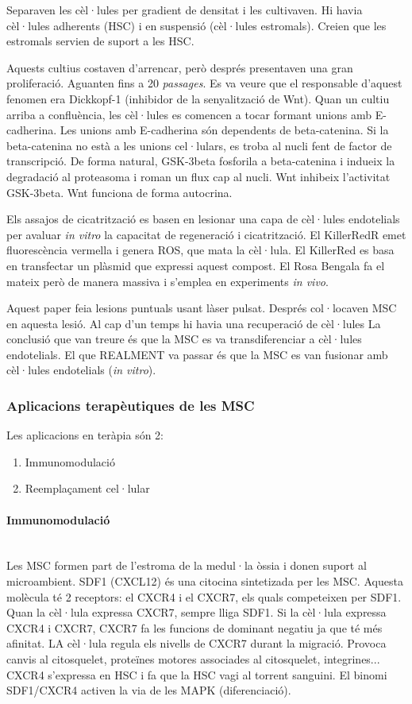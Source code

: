 Separaven les cèl·lules per gradient de densitat i les cultivaven. Hi
havia cèl·lules adherents (HSC) i en suspensió (cèl·lules
estromals). Creien que les estromals servien de suport a les HSC.

Aquests cultius costaven d'arrencar, però després presentaven una gran
proliferació. Aguanten fins a 20 \textit{passages}. Es va veure que el
responsable d'aquest fenomen era Dickkopf-1 (inhibidor de la
senyalització de Wnt). Quan un cultiu arriba a confluència, les
cèl·lules es comencen a tocar formant unions amb E-cadherina. Les
unions amb E-cadherina són dependents de beta-catenina. Si la
beta-catenina no està a les unions cel·lulars, es troba al nucli fent
de factor de transcripció. De forma natural, GSK-3beta fosforila a
beta-catenina i indueix la degradació al proteasoma i roman un flux
cap al nucli. Wnt inhibeix l'activitat GSK-3beta. Wnt funciona de
forma autocrina.


Els assajos de cicatrització es basen en lesionar una capa de
cèl·lules endotelials per avaluar \textit{in vitro} la capacitat de
regeneració i cicatrització. El KillerRedR emet fluorescència
vermella i genera ROS, que mata la cèl·lula. El KillerRed es basa en
transfectar un plàsmid que expressi aquest compost. El Rosa Bengala fa
el mateix però de manera massiva i s'emplea en experiments \textit{in
  vivo}.

Aquest paper feia lesions puntuals usant làser pulsat. Després
col·locaven MSC en aquesta lesió. Al cap d'un temps hi havia una
recuperació de cèl·lules La conclusió que van treure és que la MSC es
va transdiferenciar a cèl·lules endotelials. El que REALMENT va passar
és que la MSC es van fusionar amb cèl·lules endotelials (\textit{in vitro}).

\subsubsection{Aplicacions terapèutiques de les MSC}
Les aplicacions en teràpia són 2:
\begin{enumerate}
\item Immunomodulació


\item Reemplaçament cel·lular
\end{enumerate}

\paragraph{Immunomodulació} \hfill \\
Les MSC formen part de l'estroma de la medul·la òssia i donen suport
al microambient. SDF1 (CXCL12) és una citocina sintetizada per les
MSC. Aquesta molècula té 2 receptors: el CXCR4 i el CXCR7, els quals
competeixen per SDF1. Quan la cèl·lula expressa CXCR7, sempre lliga
SDF1. Si la cèl·lula expressa CXCR4 i CXCR7, CXCR7 fa les funcions de
dominant negatiu ja que té més afinitat. LA cèl·lula regula els
nivells de CXCR7 durant la migració. Provoca canvis al citosquelet,
proteïnes motores associades al citosquelet, integrines... CXCR4
s'expressa en HSC i fa que la HSC vagi al torrent sanguini. El binomi
SDF1/CXCR4 activen la via de les MAPK (diferenciació).

